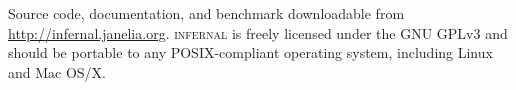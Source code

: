 Source code, documentation, and benchmark downloadable from
\url{http://infernal.janelia.org}. \textsc{infernal} is freely
licensed under the GNU GPLv3 and should be portable to any
POSIX-compliant operating system, including Linux and Mac OS/X.

